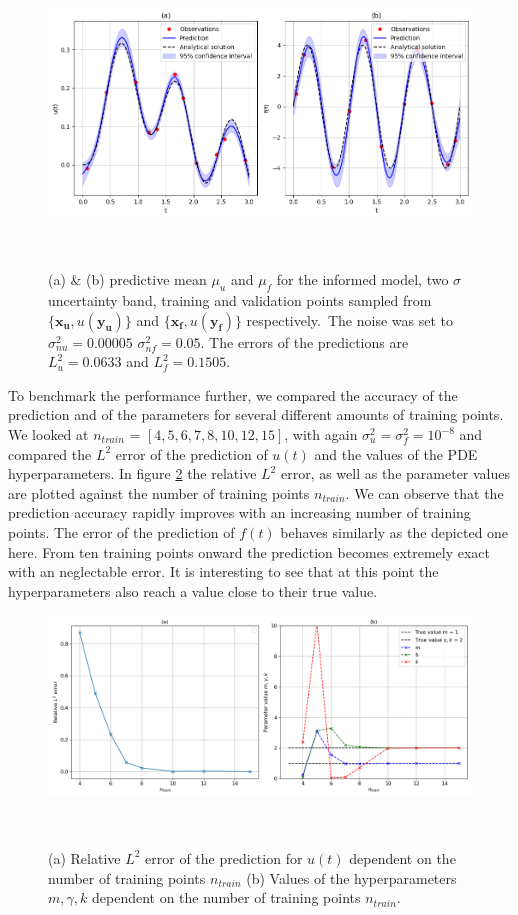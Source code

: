\documentclass{article}
\begin{document}
\begin{figure}[htbp!]
    \centering
    \includegraphics[width=1\textwidth]{../final_examples/oscillator/oscillator_noise.png}
    \caption{(a) \& (b) predictive mean $\mu_u$ and $\mu_f$ for the informed model, two $\sigma$ uncertainty band, training and validation points sampled from $\{\bm{x_u},u(\bm{y_u})\}$ and $\{\bm{x_f},u(\bm{y_f})\}$ respectively.\ The noise was set to $\sigma_{nu}^2 = 0.00005$  $\sigma_{nf}^2 = 0.05$. The errors of the predictions are $L^2_u = 0.0633 $ and $L^2_f = 0.1505$.}
    ~\label{fig:damped_oscillator_with_noise}
\end{figure}
To benchmark the performance further, we compared the accuracy of the prediction and of the parameters for several different amounts of training points. We looked at $n_{train}$ = $\left[4,5,6,7,8,10,12,15\right]$, with again $\sigma^2_u = \sigma^2_f = 10^{-8}$ and compared the $L^2$ error of the prediction of $u(t)$ and the values of the PDE hyperparameters. In figure \ref{fig:damped_oscillator_L2} the relative $L^2$ error, as well as the parameter values are plotted against the number of training points $n_{train}$. We can observe that the prediction accuracy rapidly improves with an increasing number of training points. The error of the prediction of $f(t)$ behaves similarly as the depicted one here. From ten training points onward the prediction becomes extremely exact with an neglectable error. It is interesting to see that at this point the hyperparameters also reach a value close to their true value. 
\begin{figure}[htbp!]
    \centering
    \includegraphics[width=1\textwidth]{../final_examples/oscillator/l2_error.png}
    \caption{(a) Relative $L^2$ error of the prediction for $u(t)$ dependent on the number of training points $n_{train}$ (b) Values of the hyperparameters $m,\gamma, k$ dependent on the number of training points $n_{train}$.}
    ~\label{fig:damped_oscillator_L2}
\end{figure}
\end{document}
